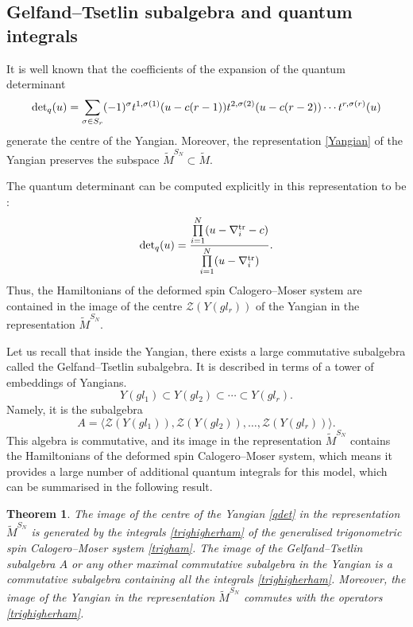 \documentclass[12pt]{amsart}
\numberwithin{equation}{section}
\newtheorem{theorem}{Theorem}[section]
\theoremstyle{definition}
\begin{document}
\subsection{Gelfand--Tsetlin subalgebra and quantum integrals}
It is well known that the coefficients of the expansion of the quantum determinant
\begin{equation*}
    {\rm  det}_q(u) = \sum\limits_{\sigma \in S_r} (-1)^{\sigma} t^{1, \sigma(1)}(u-c(r-1)) t^{2, \sigma(2)}(u-c(r-2)) \cdots 
    t^{r, \sigma(r)} (u)
\end{equation*}
generate the centre of the Yangian. Moreover, the representation \eqref{Yangian} of the Yangian preserves the subspace
$\widetilde{M}^{S_N}\subset \widetilde{M}$. 

The quantum determinant can be computed explicitly in this representation to be \cite{BAB}:
\begin{equation} \label{qdet}
    {\rm det}_q(u) = \frac{\prod\limits_{i = 1}^N (u  - \nabla^{\rm tr}_i - c)}{\prod\limits_{i = 1}^N (u - \nabla^{\rm tr}_i)}.
\end{equation}
Thus, the Hamiltonians of the deformed spin Calogero--Moser system are contained in the image of the centre $\mathcal{Z}(Y(gl_r))$ of the Yangian in the representation $\widetilde{M}^{S_N}$. 

Let us recall that
inside the Yangian, there exists a large commutative subalgebra called the Gelfand--Tsetlin subalgebra. It is
described in terms of a tower of embeddings of Yangians.
\begin{equation*}
    Y(gl_1) \subset Y(gl_2) \subset \cdots \subset Y(gl_r).
\end{equation*}
Namely, it is the subalgebra
\begin{equation*}
    A = \langle \mathcal{Z}(Y(gl_1)), \mathcal{Z}(Y(gl_2)) , \ldots, \mathcal{Z}(Y(gl_r)) \rangle.
\end{equation*}
This algebra is commutative, and its image in the representation $\widetilde{M}^{S_N}$ contains the Hamiltonians of the deformed spin Calogero--Moser system, which means it provides a large number of additional quantum integrals for this model, which can be summarised in the following result.
\begin{theorem}
    The image of the centre of the Yangian \eqref{qdet} in the representation
    $\widetilde{M}^{S_N}$ is generated by
    the integrals \eqref{trighigherham} of the generalised trigonometric spin
    Calogero--Moser system \eqref{trigham}.
    The image of the Gelfand--Tsetlin subalgebra $A$ or any other maximal commutative 
    subalgebra in the Yangian is a commutative subalgebra containing all the 
    integrals \eqref{trighigherham}. Moreover,
    the image of the Yangian in the representation $\widetilde{M}^{S_N}$ 
    commutes with the operators \eqref{trighigherham}.
\end{theorem}
\end{document}
